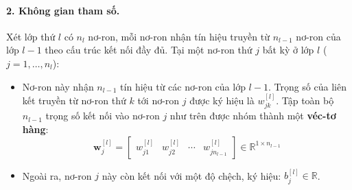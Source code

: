 \paragraph{2. Không gian tham số.\\}
Xét lớp thứ $l$ có $n_l$ nơ-ron, mỗi nơ-ron nhận tín hiệu truyền từ $n_{l-1}$ nơ-ron của lớp $l-1$ theo cấu trúc kết nối đầy đủ. Tại một nơ-ron thứ $j$ bất kỳ ở lớp $l$ ($j = 1, \dots, n_l$):
\begin{itemize}
    \item Nơ-ron này nhận $n_{l-1}$ tín hiệu từ các nơ-ron của lớp $l-1$. Trọng số của liên kết truyền từ nơ-ron thứ $k$ tới nơ-ron $j$ được ký hiệu là $w_{jk}^{[l]}$. Tập toàn bộ $n_{l-1}$ trọng số kết nối vào nơ-ron $j$ như trên được nhóm thành một \textbf{véc-tơ hàng}:
    $$\mathbf{w}_j^{[l]} = \begin{bmatrix} w_{j1}^{[l]} & w_{j2}^{[l]} & \cdots & w_{j n_{l-1}}^{[l]} \end{bmatrix} \in \mathbb{R}^{1 \times n_{l-1}}$$
    \item Ngoài ra, nơ-ron $j$ này còn kết nối với một độ chệch, ký hiệu: $b_j^{[l]} \in \mathbb{R}$.
\end{itemize}

